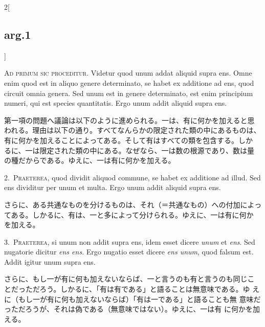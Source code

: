 \documentclass[paper=a4paper,fontsize=10pt,jafontsize=9pt,titlepage]{jlreq}
\begin{document}
\begin{paracol}{2}[\subsection{arg.1}]

{\huge A}{\scshape d primum sic proceditur}. Videtur quod unum addat aliquid supra
ens. Omne enim quod est in aliquo genere determinato, se habet ex
additione ad ens, quod circuit omnia genera. Sed unum est in genere
determinato, est enim principium numeri, qui est species
quantitatis. Ergo unum addit aliquid supra ens.

\switchcolumn

第一項の問題へ議論は以下のように進められる。一は、有に何かを加えると思
われる。理由は以下の通り。すべてなんらかの限定された類の中にあるものは、
有に何かを加えることによってある。そして有はすべての類を包含する。しか
るに、一は限定された類の中にある。なぜなら、一は数の根源であり、数は量
の種だからである。ゆえに、一は有に何かを加える。


2.~{\scshape Praeterea}, quod dividit aliquod commune, se habet ex additione ad
illud. Sed ens dividitur per unum et multa. Ergo unum addit aliquid
supra ens.

\switchcolumn

さらに、ある共通なものを分けるものは、それ（＝共通なもの）への付加によっ
てある。しかるに、有は、一と多によって分けられる。ゆえに、一は有に何か
を加える。


3.~{\scshape Praeterea}, si unum non addit supra ens, idem esset dicere
{\itshape unum} et {\itshape ens}. Sed nugatorie dicitur {\itshape ens
ens}. Ergo nugatio esset dicere {\itshape ens unum}, quod falsum
est. Addit igitur unum supra ens.

\switchcolumn

さらに、もし一が有に何も加えないならば、一と言うのも有と言うのも同じこ
とだっただろう。しかるに、「有は有である」と語ることは無意味である。ゆ
 えに（もし一が有に何も加えないならば）「有は一である」と語ることも無
 意味だっただろうが、それは偽である（無意味ではない）。ゆえに、一は有
に何かを加える。


\end{paracol}
\end{document}

